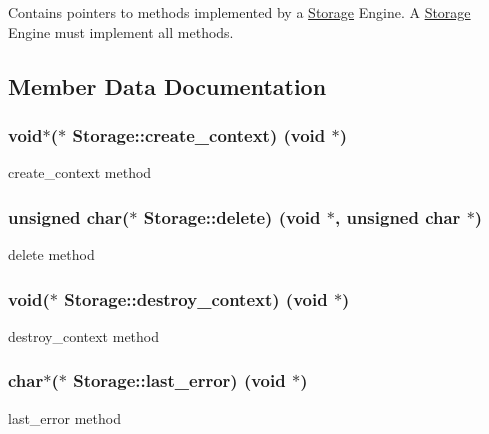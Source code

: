Contains pointers to methods implemented by a \hyperlink{struct_storage}{Storage} Engine. A \hyperlink{struct_storage}{Storage} Engine must implement all methods. 

\subsection{Member Data Documentation}
\hypertarget{struct_storage_a96d6e9b9bfd5b4943eb9660ca2293447}{}
\subsubsection[{create\+\_\+context}]{\setlength{\rightskip}{0pt plus 5cm}void$\ast$($\ast$ Storage\+::create\+\_\+context) (void $\ast$)}\label{struct_storage_a96d6e9b9bfd5b4943eb9660ca2293447}
create\+\_\+context method \hypertarget{struct_storage_ae33c4c6b8e7dda3a854c3754ecbd22d9}{}
\subsubsection[{delete}]{\setlength{\rightskip}{0pt plus 5cm}unsigned char($\ast$ Storage\+::delete) (void $\ast$, unsigned char $\ast$)}\label{struct_storage_ae33c4c6b8e7dda3a854c3754ecbd22d9}
delete method \hypertarget{struct_storage_af425b1971a9fcfed315e6aec547df8da}{}
\subsubsection[{destroy\+\_\+context}]{\setlength{\rightskip}{0pt plus 5cm}void($\ast$ Storage\+::destroy\+\_\+context) (void $\ast$)}\label{struct_storage_af425b1971a9fcfed315e6aec547df8da}
destroy\+\_\+context method \hypertarget{struct_storage_a32909539bbc234d20b4bb0a51c575c9c}{}
\subsubsection[{last\+\_\+error}]{\setlength{\rightskip}{0pt plus 5cm}char$\ast$($\ast$ Storage\+::last\+\_\+error) (void $\ast$)}\label{struct_storage_a32909539bbc234d20b4bb0a51c575c9c}
last\+\_\+error method \hypertarget{struct_storage_a6f8774ce9a6598367d47eaeafaf245d4}{}
